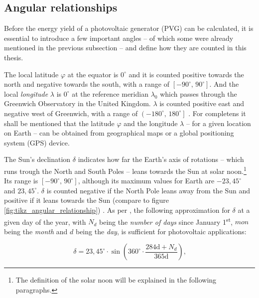 %
%
%


\subsection{Angular relationships}
Before the energy yield of a photovoltaic generator (PVG) can be calculated, it is essential to introduce a few important angles -- of which some were already mentioned in the previous subsection -- and define how they are counted in this thesis.

The local latitude $\varphi$ at the equator is $0^\circ$ and it is counted positive towards the north and negative towards the south, with a range of $\left[-90^\circ \text{, } 90^\circ\right]$. And the local \emph{longitude} $\lambda$ is $0^\circ$ at the reference meridian $\lambda_0$ which passes through the Greenwich Observatory in the United Kingdom. $\lambda$ is counted positive east and negative west of Greenwich, with a range of $\left(-180^\circ \text{, } 180^\circ\right]$ \cite{Appelbaum:1993, Karttunen:2006, Wagner:2018}. For completens it shall be mentioned that the latitude $\varphi$ and the longitude $\lambda$ -- for a given location on Earth -- can be obtained from geographical maps or a global positioning system (GPS) device.

The Sun's declination $\delta$ indicates how far the Earth's axis of rotations -- which runs trough the North and South Poles -- leans towards the Sun at solar noon.\footnote{The definition of the solar noon will be explained in the following paragraphs.} Its range is $\left[-90^\circ \text{, } 90^\circ\right]$, although its maximum values for Earth are $-23,45^\circ$ and $23,45^\circ$. $\delta$ is counted negative if the North Pole leans away from the Sun and positive if it leans towards the Sun (compare to figure \ref{fig:tikz_angular_relationship}) \cite{Appelbaum:1993, Karttunen:2006, Mertens:2015, Wagner:2018}. As per \cite{Wagner:2018}, the following approximation for $\delta$ at a given day of the year, with $N_d$ being the \emph{number of days} since January 1\textsuperscript{st},  $mon$ being the \emph{month} and $d$ being the \emph{day}, is sufficient for photovoltaic applications: 

\begin{center}
	\begin{equation} \label{eq:delta}
		\delta = 23,45^\circ \cdot \sin \left(360^\circ \cdot \frac{284\mathrm{d} + N_d}{365\mathrm{d}}\right) \text{,} 
	\end{equation}
\end{center}

